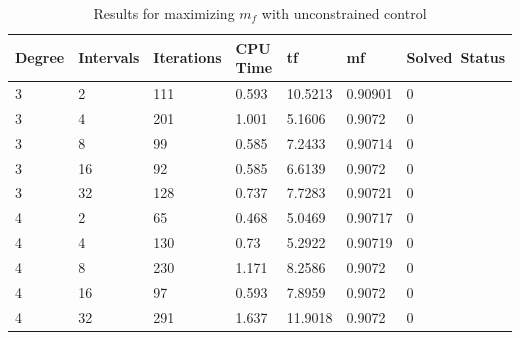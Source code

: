\documentclass[]{article}
\begin{document}
	\begin{table}
		\begin{tabular}{lllllll}
			Degree & Intervals & Iterations & CPU Time & tf & mf & Solved\ Status \\ 
			\hline 
			3 & 2 & 111 & 0.593 & 10.5213 & 0.90901 & 0 \\ 
			3 & 4 & 201 & 1.001 & 5.1606 & 0.9072 & 0 \\ 
			3 & 8 & 99 & 0.585 & 7.2433 & 0.90714 & 0 \\ 
			3 & 16 & 92 & 0.585 & 6.6139 & 0.9072 & 0 \\ 
			3 & 32 & 128 & 0.737 & 7.7283 & 0.90721 & 0 \\ 
			4 & 2 & 65 & 0.468 & 5.0469 & 0.90717 & 0 \\ 
			4 & 4 & 130 & 0.73 & 5.2922 & 0.90719 & 0 \\ 
			4 & 8 & 230 & 1.171 & 8.2586 & 0.9072 & 0 \\ 
			4 & 16 & 97 & 0.593 & 7.8959 & 0.9072 & 0 \\ 
			4 & 32 & 291 & 1.637 & 11.9018 & 0.9072 & 0 \\ 
			\hline 
		\end{tabular}
		\caption{Results for maximizing \(m_f\) with unconstrained control}
		\label{table:2}
	\end{table}
	\FloatBarrier
\end{document}

